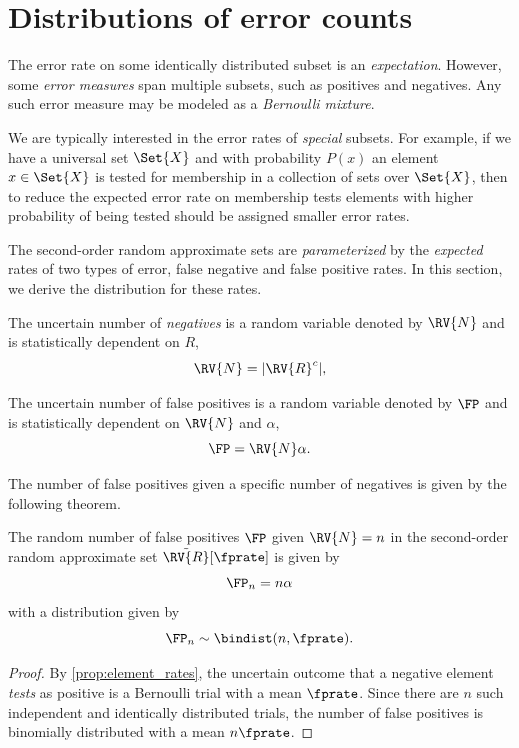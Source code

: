 \section{Distributions of error counts}
\label{sec:characteristics}
The error rate on some identically distributed subset is an \emph{expectation}.
However, some \emph{error measures} span multiple subsets, such as positives and negatives.
Any such error measure may be modeled as a \emph{Bernoulli mixture}.

We are typically interested in the error rates of \emph{special} subsets.
For example, if we have a universal set $\Set{X}$ and with probability $P(x)$ an element $x \in \Set{X}$ is tested for membership in a collection of sets over $\Set{X}$, then to reduce the expected error rate on membership tests elements with higher probability of being tested should be assigned smaller error rates.


The second-order random approximate sets are \emph{parameterized} by the \emph{expected} rates of two types of error, false negative and false positive rates.
In this section, we derive the distribution for these rates.

\begin{definition}
The uncertain number of \emph{negatives} is a random variable denoted by $\RV{N}$ and is statistically dependent on $R$,
\begin{equation}
\RV{N} = |\RV{R}^c|,
\end{equation}
\end{definition}

\begin{definition}
The uncertain number of false positives is a random variable denoted by $\FP$ and is statistically dependent on $\RV{N}$ and $\alpha$,
\begin{equation}
	\FP = \RV{N} \alpha.
\end{equation}
\end{definition}

The number of false positives given a specific number of negatives is given by the following theorem.
\begin{theorem}
\label{thm:fpbinom}
The random number of false positives $\FP$ given $\RV{N} = n$ in the second-order random approximate set $\tilde{\RV{R}}[\fprate]$ is given by
\begin{equation}
	\FP_n = n \alpha
\end{equation}
with a distribution given by
\begin{equation}
    \FP_n \sim \bindist(n, \fprate).
\end{equation}
\end{theorem}
\begin{proof}
By \cref{prop:element_rates}, the uncertain outcome that a negative element \emph{tests} as positive is a Bernoulli trial with a mean $\fprate$.
Since there are $n$ such independent and identically distributed trials, the number of false positives is binomially distributed with a mean $n \fprate$.
\end{proof}

